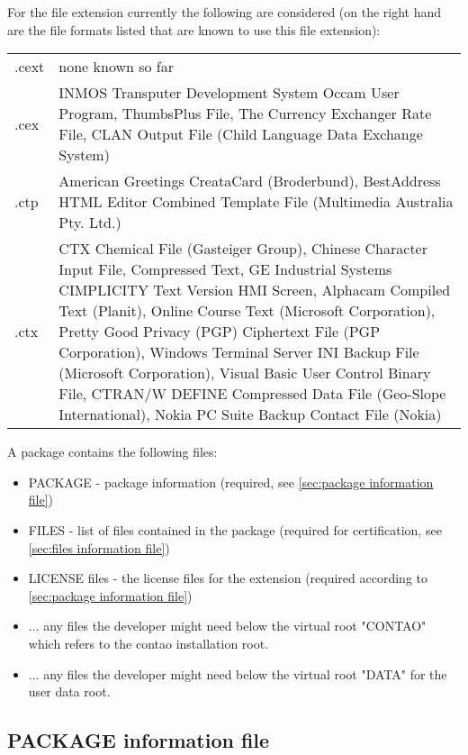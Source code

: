 For the file extension currently the following are considered (on the right hand are the file formats listed that are known to use this file extension):
\\
\begin{tabular}{lp{}}\\
.cext & none known so far\\
.cex  & INMOS Transputer Development System Occam User Program, ThumbsPlus File, The Currency Exchanger Rate File, CLAN Output File (Child Language Data Exchange System)\\
.ctp  & American Greetings CreataCard (Broderbund), BestAddress HTML Editor Combined Template File (Multimedia Australia Pty. Ltd.)\\
.ctx  & CTX Chemical File (Gasteiger Group), Chinese Character Input File, Compressed Text, GE Industrial Systems CIMPLICITY Text Version HMI Screen, Alphacam Compiled Text (Planit), Online Course Text (Microsoft Corporation), Pretty Good Privacy (PGP) Ciphertext File (PGP Corporation), Windows Terminal Server INI Backup File (Microsoft Corporation), Visual Basic User Control Binary File, CTRAN/W DEFINE Compressed Data File (Geo-Slope International), Nokia PC Suite Backup Contact File (Nokia)\\
\end{tabular}

A package contains the following files:
\begin{itemize}
\item PACKAGE - package information (required, see \ref{sec:package information file})
\item FILES - list of files contained in the package (required for certification, see \ref{sec:files information file})
\item LICENSE files - the license files for the extension (required according to \ref{sec:package information file})
\item ... any files the developer might need below the virtual root "CONTAO" which refers to the contao installation root.
\item ... any files the developer might need below the virtual root "DATA" for the user data root.
\end{itemize}

\subsection[sec:package information file]{PACKAGE information file}

